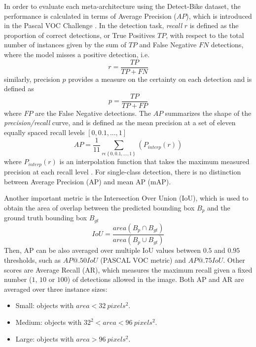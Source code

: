 \documentclass[journal]{IEEEtran}
\begin{document}
In order to evaluate each meta-architecture using the Detect-Bike dataset, the performance is calculated in terms of Average Precision ($AP$), which is introduced in the Pascal VOC Challenge \cite{PASCAL}. In the detection task, \textit{recall} $r$ is defined as the proportion of correct detections, or True Positives $TP$, with respect to the total number of instances given by the sum of $TP$ and False Negative $FN$ detections, where the model misses a positive detection, i.e.
\begin{equation}
  r=\frac{TP}{TP+FN}  
\label{eq:Recall}
\end{equation}
similarly, precision $p$ provides a measure on the certainty on each detection and is defined as
\begin{equation}
  p=\frac{TP}{TP+FP}
  \label{eq:Precision}
\end{equation}
where $FP$ are the False Negative detections. The $AP$ summarizes the shape of the \textit{precision/recall} curve, and is defined as the mean precision at a set of eleven equally spaced recall levels $[0,0.1,...,1]$ 
\begin{equation}
AP=\frac{1}{11}\sum_{r\epsilon\left \{ 0,0.1,...,1 \right \} }^{ }\left( P_{interp}{\left (  r\right )} \right )
\label{eq:InterpolateAP}
\end{equation}
where $P_{interp}(r)$ is an interpolation function that takes the maximum measured precision at each recall level \cite{PASCAL}. For single-class detection, there is no distinction between Average Precision (AP) and mean AP (mAP). 

Another important metric is the Intersection Over Union (IoU), which is used to obtain the area of overlap between the predicted bounding box $B_{p}$ and the ground truth bounding box $B_{gt}$
\begin{equation}
IoU=\frac{area\left ( B_{p}\cap B_{gt}  \right )}{area\left ( B_{p}\cup  B_{gt}  \right )}
\label{IoU}
\end{equation}
Then, AP can be also averaged over multiple IoU values between $0.5$ and $0.95$ thresholds, such as $AP@.50IoU$ (PASCAL VOC metric) and $AP@.75IoU$. Other scores are Average Recall (AR), which measures the maximum recall given a fixed number ($1$, $10$ or $100$) of detections allowed in the image. Both AP and AR are averaged over three instance sizes: 
\begin{itemize}
  \item Small: objects with $area< 32\ pixels^{2}$.
  \item Medium: objects with $32^{2}<area<96\ pixels^{2}$.
  \item Large: objects with $area>96\ pixels^{2}$.
\end{itemize}
\end{document}
